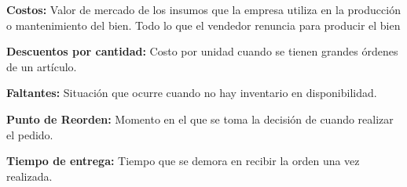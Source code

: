 \noindent
\textbf{Costos:} Valor de mercado de los insumos que la empresa utiliza en la producción o mantenimiento del bien. Todo lo que el vendedor renuncia para producir el bien \citep{mankiw2007principios}\vspace{0.25cm}

\noindent
\textbf{Descuentos por cantidad:} Costo por unidad cuando se tienen grandes órdenes de un artículo. \citep{render2006metodos}\vspace{0.25cm}

\noindent
\textbf{Faltantes:} Situación que ocurre cuando no hay inventario en disponibilidad. \citep{render2006metodos}\vspace{0.25cm}

\noindent
\textbf{Punto de Reorden:} Momento en el que se toma la decisión de cuando realizar el pedido. \citep{taha2012investigacion}\vspace{0.25cm}

\noindent
\textbf{Tiempo de entrega:} Tiempo que se demora en recibir la orden una vez realizada. \citep{render2006metodos}






















